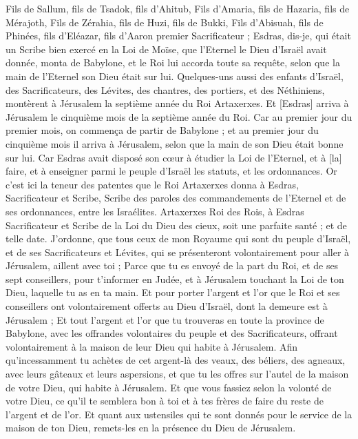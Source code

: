 \begin{multicols}{2}
Fils de Sallum, fils de Tsadok, fils d'Ahitub,
Fils d'Amaria, fils de Hazaria, fils de Mérajoth,
Fils de Zérahia, fils de Huzi, fils de Bukki,
Fils d'Abisuah, fils de Phinées, fils d'Eléazar, fils d'Aaron premier Sacrificateur ;
Esdras, dis-je, qui était un Scribe bien exercé en la Loi de Moïse, que l'Eternel le Dieu d'Israël avait donnée, monta de Babylone, et le Roi lui accorda toute sa requête, selon que la main de l'Eternel son Dieu était sur lui.
Quelques-uns aussi des enfants d'Israël, des Sacrificateurs, des Lévites, des chantres, des portiers, et des Néthiniens, montèrent à Jérusalem la septième année du Roi Artaxerxes.
Et [Esdras] arriva à Jérusalem le cinquième mois de la septième année du Roi.
Car au premier jour du premier mois, on commença de partir de Babylone ; et au premier jour du cinquième mois il arriva à Jérusalem, selon que la main de son Dieu était bonne sur lui.
Car Esdras avait disposé son cœur à étudier la Loi de l'Eternel, et à [la] faire, et à enseigner parmi le peuple d'Israël les statuts, et les ordonnances.
Or c'est ici la teneur des patentes que le Roi Artaxerxes donna à Esdras, Sacrificateur et Scribe, Scribe des paroles des commandements de l'Eternel et de ses ordonnances, entre les Israélites.
Artaxerxes Roi des Rois, à Esdras Sacrificateur et Scribe de la Loi du Dieu des cieux, soit une parfaite santé ; et de telle date.
J'ordonne, que tous ceux de mon Royaume qui sont du peuple d'Israël, et de ses Sacrificateurs et Lévites, qui se présenteront volontairement pour aller à Jérusalem, aillent avec toi ;
Parce que tu es envoyé de la part du Roi, et de ses sept conseillers, pour t'informer en Judée, et à Jérusalem touchant la Loi de ton Dieu, laquelle tu as en ta main.
Et pour porter l'argent et l'or que le Roi et ses conseillers ont volontairement offerts au Dieu d'Israël, dont la demeure est à Jérusalem ;
Et tout l'argent et l'or que tu trouveras en toute la province de Babylone, avec les offrandes volontaires du peuple et des Sacrificateurs, offrant volontairement à la maison de leur Dieu qui habite à Jérusalem.
Afin qu'incessamment tu achètes de cet argent-là des veaux, des béliers, des agneaux, avec leurs gâteaux et leurs aspersions, et que tu les offres sur l'autel de la maison de votre Dieu, qui habite à Jérusalem.
Et que vous fassiez selon la volonté de votre Dieu, ce qu'il te semblera bon à toi et à tes frères de faire du reste de l'argent et de l'or.
Et quant aux ustensiles qui te sont donnés pour le service de la maison de ton Dieu, remets-les en la présence du Dieu de Jérusalem.

\end{multicols}

